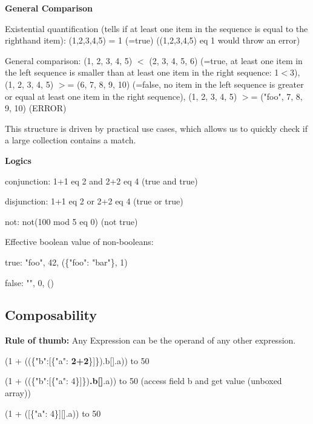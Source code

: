 \documentclass[11pt,oneside,a4paper]{article}
\begin{document}
{\textbf{General Comparison}
\begin{compactitem}
\item Existential quantification (tells if at least one item in the sequence is equal to the righthand item): (1,2,3,4,5) = 1 (=true) ((1,2,3,4,5) eq 1 would throw an error)
\item General comparison: (1, 2, 3, 4, 5) $<$ (2, 3, 4, 5, 6) (=true, at least one item in the left sequence is smaller than at least one item in the right sequence: 1$<$3), (1, 2, 3, 4, 5) $>$= (6, 7, 8, 9, 10) (=false, no item in the left sequence is greater or equal at least one item in the right sequence), (1, 2, 3, 4, 5) $>$= ("foo", 7, 8, 9, 10) (ERROR)
\end{compactitem}

This structure is driven by practical use cases, which allows us to quickly check if a large collection contains a match.

\textbf{Logics}
\begin{compactitem}
\item conjunction: 1+1 eq 2 and 2+2 eq 4 (true and true)
\item disjunction: 1+1 eq 2 or 2+2 eq 4 (true or true)
\item not: not(100 mod 5 eq 0) (not true)
\item Effective boolean value of non-booleans:
\begin{compactitem}
	\item true: "foo", 42, (\{"foo": "bar"\}, 1)
	\item false: "", 0, ()\\
\end{compactitem}
\end{compactitem}

\subsection{Composability}

\textbf{Rule of thumb:} Any Expression can be the operand of any other expression.

\begin{compactitem}
\item (1 + ((\{"b":[\{"a": \textbf{2+2}\}]\}).b[].a)) to 50
\item (1 + ((\{"b":[\{"a": 4\}]\})\textbf{.b[]}.a)) to 50 (access field b and get value (unboxed array))
\item (1 + ([\{"a": 4\}][].a)) to 50
\end{compactitem}


}
\end{document}
